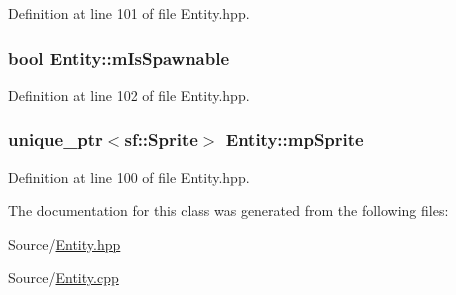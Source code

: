 Definition at line 101 of file Entity.\-hpp.

\hypertarget{class_entity_a13cc8677fa51642cc3d60c13e9566dab}{
\subsubsection[{m\-Is\-Spawnable}]{\setlength{\rightskip}{0pt plus 5cm}bool Entity\-::m\-Is\-Spawnable\hspace{0.3cm}{\ttfamily [protected]}}}\label{class_entity_a13cc8677fa51642cc3d60c13e9566dab}


Definition at line 102 of file Entity.\-hpp.

\hypertarget{class_entity_a52b9048640f6ffadfbc3e93d6184fe1f}{
\subsubsection[{mp\-Sprite}]{\setlength{\rightskip}{0pt plus 5cm}unique\-\_\-ptr$<$sf\-::\-Sprite$>$ Entity\-::mp\-Sprite\hspace{0.3cm}{\ttfamily [protected]}}}\label{class_entity_a52b9048640f6ffadfbc3e93d6184fe1f}


Definition at line 100 of file Entity.\-hpp.



The documentation for this class was generated from the following files\-:\begin{DoxyCompactItemize}
\item 
Source/\hyperlink{_entity_8hpp}{Entity.\-hpp}\item 
Source/\hyperlink{_entity_8cpp}{Entity.\-cpp}\end{DoxyCompactItemize}
